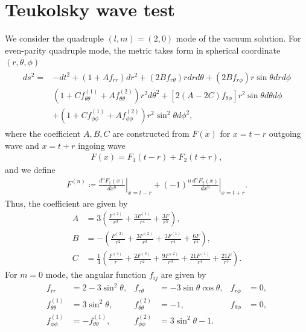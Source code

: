 \section{Teukolsky wave test}
\label{section4.2}
We consider the quadruple $(l,m)=(2,0)$ mode of the vacuum solution.
For even-parity quadruple mode, the metric takes form \cite{teukolsky1982linearized} in spherical coordinate $(r, \theta, \phi)$
\begin{align}
    \begin{split}
    ds^2 =& - dt^2 + \left(1 + A f_{rr}\right) dr^2 + \left(2 B f_{r\theta}\right) r dr d\theta
    + \left(2 B f_{r\phi} \right) r \sin\theta dr d\phi \\
    & \left(1 + C f^{(1)}_{\theta\theta} + A f^{(2)}_{\theta\theta} \right) r^2 d\theta^2
    + \left[2 \left(A-2C\right) f_{\theta\phi} \right] r^2 \sin\theta d\theta d\phi \\
    & + \left(1 + C f^{(1)}_{\phi\phi} + A f^{(2)}_{\phi\phi} \right) r^2 \sin^2\theta d\phi^2,
    \end{split}
\end{align}
where the coefficient $A,B,C$ are constructed from $F(x)$ for $x=t-r$ outgoing wave and $x=t+r$ ingoing wave
\begin{align}
    F(x) = F_1 (t-r) + F_2 (t+r),
\end{align}
and we define
\begin{align}
    F^{(n)} \coloneqq \left. \frac{d^n F_1(x)}{dx^n} \right|_{x=t-r} + (-1)^n \left. \frac{d^n F_2(x)}{dx^n} \right|_{x=t+r}.
\end{align}
Thus, the coefficient are given by
\begin{align}
    A &= 3 \left( \frac{F^{(2)}}{r^3} + \frac{3 F^{(1)}}{r^4} + \frac{3 F}{r^5} \right), \\
    B &= - \left( \frac{F^{(3)}}{r^2} + \frac{3F^{(2)}}{r^3} + \frac{3F^{(1)}}{r^4} + \frac{6F}{r^5} \right), \\
    C &= \frac{1}{4} \left( \frac{F^{(4)}}{r} + \frac{2F^{(3)}}{r^2} + \frac{9F^{(2)}}{r^3} + \frac{21F^{(1)}}{r^4} + \frac{21F}{r^5} \right).
\end{align}
For $m=0$ mode, the angular function $f_{ij}$ are given by
\begin{align}
    f_{rr} &= 2 - 3 \sin^2 \theta, & f_{r\theta} &= - 3 \sin\theta \cos\theta, & f_{r\phi} &= 0, \\
    f_{\theta\theta}^{(1)} &= 3 \sin^2\theta, & f_{\theta\theta}^{(2)} &= -1, & f_{\theta\phi} &= 0, \\
    f_{\phi\phi}^{(1)} &= - f_{\theta\theta}^{(1)}, & f_{\phi\phi}^{(2)} &= 3 \sin^2 \theta - 1.
\end{align}
